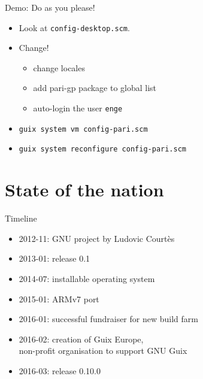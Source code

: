 \documentclass [t]{beamer}
\begin{document}
\begin {frame}{Demo: Do as you please!}
\begin {itemize}
\item
Look at \texttt {config-desktop.scm}.
\pause
\item
Change!
\begin {itemize}
\item
change locales
\item
add pari-gp package to global list
\item
auto-login the user \texttt {enge}
\end {itemize}

\pause
\item
\texttt {guix system vm config-pari.scm}

\pause
\item
\texttt {guix system reconfigure config-pari.scm}
\end {itemize}
\end {frame}


\section {State of the nation}

\begin {frame}{Timeline}
\begin {itemize}
\item
2012-11: GNU project by Ludovic Courtès
\item
2013-01: release 0.1
\item
2014-07: \textcolor {blau}{installable operating system}
\item
2015-01: ARMv7 port
\item
2016-01: successful fundraiser for new build farm
\item
2016-02: creation of \textcolor {blau}{Guix Europe}, \\
non-profit organisation to support GNU Guix
\item
2016-03: release 0.10.0
\end {itemize}
\end {frame}
\end{document}
